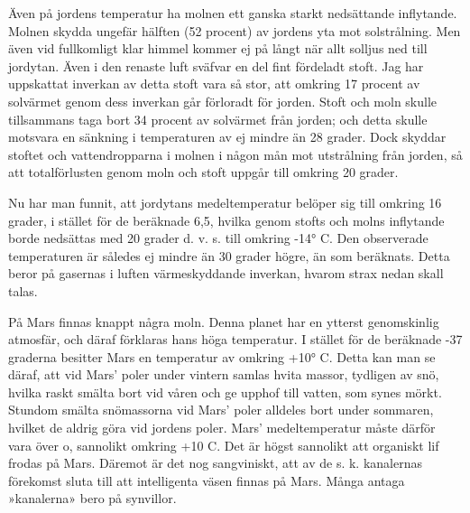 \documentclass[a4paper, 12pt, oneside, swedish]{article}
\begin{document}
Även på jordens temperatur ha molnen ett ganska starkt nedsättande inflytande. Molnen skydda ungefär hälften (52 procent) av jordens yta mot solstrålning. Men även vid fullkomligt klar himmel kommer ej på långt när allt solljus ned till jordytan. Även i den renaste luft sväfvar en del fint fördeladt stoft. Jag har uppskattat inverkan av detta stoft vara så stor, att omkring 17 procent av solvärmet genom dess inverkan går förloradt för jorden. Stoft och moln skulle tillsammans taga bort 34 procent av solvärmet från jorden; och detta skulle motsvara en sänkning i temperaturen av ej mindre än 28 grader. Dock skyddar stoftet och vattendropparna i molnen i någon mån mot utstrålning från jorden, så att totalförlusten genom moln och stoft uppgår till omkring 20 grader.

Nu har man funnit, att jordytans medeltemperatur belöper sig till omkring 16 grader, i stället för de beräknade 6,5, hvilka genom stofts och molns inflytande borde nedsättas med 20 grader d. v. s. till omkring -14° C. Den observerade temperaturen är således ej mindre än 30 grader högre, än som beräknats. Detta beror på gasernas i luften värmeskyddande inverkan, hvarom strax nedan skall talas.

På Mars finnas knappt några moln. Denna planet har en ytterst genomskinlig atmosfär, och däraf förklaras hans höga temperatur. I stället för de beräknade -37 graderna besitter Mars en temperatur av omkring +10° C. Detta kan man se däraf, att vid Mars' poler under vintern samlas hvita massor, tydligen av snö, hvilka raskt smälta bort vid våren och ge upphof till vatten, som synes mörkt. Stundom smälta snömassorna vid Mars' poler alldeles bort under sommaren, hvilket de aldrig göra vid jordens poler. Mars' medeltemperatur måste därför vara över o, sannolikt omkring +10 C. Det är högst sannolikt att organiskt lif frodas på Mars. Däremot är det nog sangviniskt, att av de s. k. kanalernas förekomst sluta till att intelligenta väsen finnas på Mars. Många antaga »kanalerna» bero på synvillor.
\end{document}
